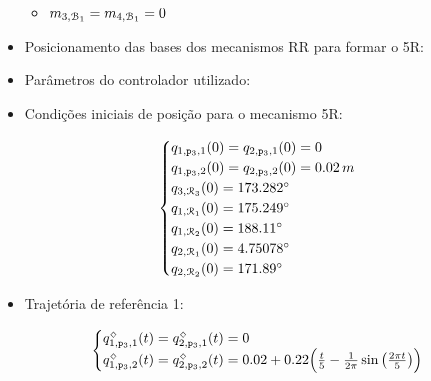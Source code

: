 \begin{itemize}
\begin{itemize}
\item $m_{3, \mathcal{B}_1} = m_{4, \mathcal{B}_1} = 0$
\end{itemize}


\item Posicionamento das bases dos mecanismos RR para formar o 5R:

\begin{itemize}
\end{itemize}

\item Par\^ametros do controlador utilizado:

\begin{itemize}
\end{itemize}

\item Condi\c{c}\~oes iniciais de posi\c{c}\~ao para o mecanismo 5R:

$$\begin{cases}
q_{1,\mathtt{p}_3,1}(0) = q_{2,\mathtt{p}_3,1}(0) = 0 \\
q_{1,\mathtt{p}_3,2}(0) = q_{2,\mathtt{p}_3,2}(0) = 0.02 \,m \\
q_{3, \mathcal{R}_3}(0) = 173.282^\circ \\
q_{1,\mathcal{R}_1}(0) = 175.249^\circ \\
q_{1,\mathcal{R}_2}(0) = 188.11^\circ \\
q_{2,\mathcal{R}_1}(0) = 4.75078^\circ \\
q_{2,\mathcal{R}_2}(0) = 171.89^\circ \\
\end{cases}$$

\item Trajet\'oria de refer\^encia 1:

$$ \begin{cases}
q_{1,\mathtt{p}_3,1}^{\scriptscriptstyle \diamondsuit}(t) = q_{2,\mathtt{p}_3,1}^{\scriptscriptstyle \diamondsuit}(t) = 0 \\
q_{1,\mathtt{p}_3,2}^{\scriptscriptstyle \diamondsuit}(t) = q_{2,\mathtt{p}_3,2}^{\scriptscriptstyle \diamondsuit}(t) = 0.02 + 0.22 \Big( \frac{t}{5} - \frac{1}{2\pi} \sin \big( \frac{2\pi t}{5} \big) \Big) \\
\end{cases}$$


\end{itemize}
